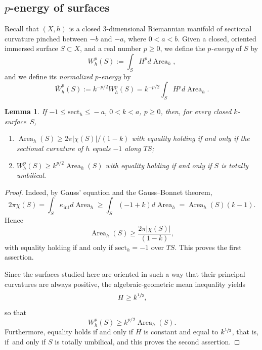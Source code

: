 \documentclass[10pt]{amsart}
\newcommand{\ksurface}{$k$\nobreakdash-surface\xspace}
\newcommand{\intt}{\mathrm{int}}
\theoremstyle{plain}
\newtheorem{lemma}[theorem]{Lemma}
\theoremstyle{definition}
\let\dans\subset
\newcommand{\sect}{\mathrm{sect}}
\DeclareMathOperator{\Area}{Area}
\begin{document}
\subsection{$p$-energy of surfaces} Recall that $(X,h)$ is a closed $3$\nobreakdash-dimensional Riemannian manifold of sectional curvature pinched between $-b$ and $-a$, where $0<a<b$. Given a closed, oriented immersed surface $S\dans X$, and a real number $p\geq 0$, we define the \emph{$p$-energy} of $S$ by
\begin{equation*}
W_h^{p}(S):=\int_S H^p d\Area_h,
\end{equation*}
and we define its \emph{normalized $p$-energy} by
\begin{equation*}
\overline{W}_h^{p}(S):=k^{-p/2}W_h^p(S)=k^{-p/2}\int_S H^p d\Area_h.
\end{equation*}

\begin{lemma}\label{lem_lower_bounds_energy}
If $-1\!\leq\!\sect_h\!\leq\! -a$, $0\!<\!k\!<\!a$, $p\!\geq\!0$, then, for every closed \ksurface~$S$,
\begin{enumerate}
\item $\Area_h(S)\geq 2\pi|\chi(S)|/(1-k)$ with equality holding if and only if the sectional curvature of $h$ equals $-1$ along $TS$;
\item $W_h^{p}(S)\geq k^{p/2}\Area_h(S)$ with equality holding if and only if $S$ is totally umbilical.
\end{enumerate}
\end{lemma}

\begin{proof}
Indeed, by Gauss' equation and the Gauss--Bonnet theorem,
\begin{equation*}
2 \pi \chi(S) = \int_{S} \kappa_{\intt}d\Area_h \geq \int_{S} (-1 + k)d\Area_h=\Area_h(S) (k-1).
\end{equation*}
Hence
\begin{equation*}
\Area_h(S) \geq \frac{2\pi\left|\chi(S)\right|}{(1-k)},
\end{equation*}
with equality holding if and only if $\sect_h=-1$ over $TS$. This proves the first assertion.

Since the surfaces studied here are oriented in such a way that their principal curvatures are always positive, the algebraic-geometric mean inequality yields
\begin{equation*}
H\geq k^{\sfrac{1}{2}},
\end{equation*}
so that
\begin{equation*}
W_h^p(S) \geq k^{p/2}\Area_h(S).
\end{equation*}
Furthermore, equality holds if and only if $H$ is constant and equal to $k^{\sfrac{1}{2}}$, that is, if~and only if $S$ is totally umbilical, and this proves the second assertion.
\end{proof}
\end{document}
